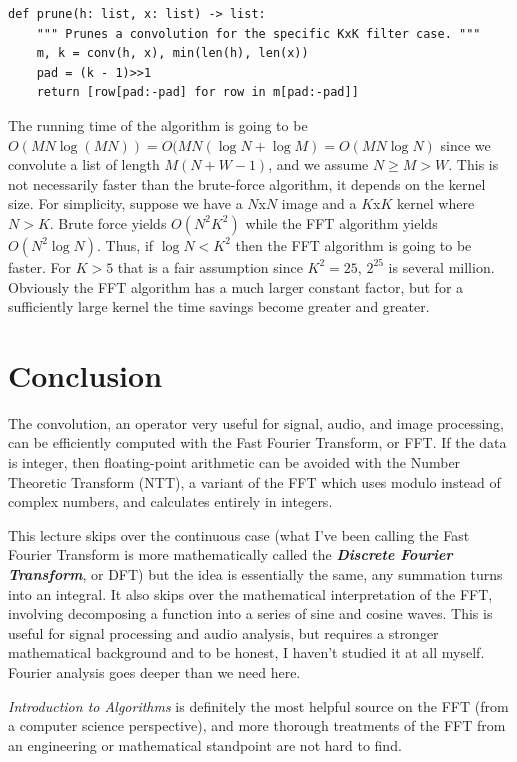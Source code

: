 \documentclass[11pt, oneside]{article}
\newcommand{\emphasis}[1]{\textbf{\textit{#1}}}
\theoremstyle{plain}
\theoremstyle{definition}
\begin{document}
\begin{verbatim}
def prune(h: list, x: list) -> list:
    """ Prunes a convolution for the specific KxK filter case. """
    m, k = conv(h, x), min(len(h), len(x))
    pad = (k - 1)>>1
    return [row[pad:-pad] for row in m[pad:-pad]]
\end{verbatim}

The running time of the algorithm is going to be
\( O(MN \log(MN)) = O(MN(\log N + \log M) = O(MN \log N) \) since we convolute 
a list of length \( M(N + W - 1) \), and we assume \( N \geq M > W \).
This is not necessarily faster than the brute-force algorithm,
it depends on the kernel size. For simplicity, suppose we have a \( N \)x\( N \)
image and a \( K \)x\( K \) kernel where \( N > K \). Brute force yields
\( O(N^2 K^2) \) while the FFT algorithm yields \( O(N^2 \log N) \).
Thus, if \( \log N < K^2 \) then the FFT algorithm is going to be faster.
For \( K > 5 \) that is a fair assumption since \( K^2 = 25 \), \( 2^{25} \)
is several million. Obviously the FFT algorithm has a much larger constant
factor, but for a sufficiently large kernel the time savings become greater
and greater.

\section{Conclusion}

The convolution, an operator very useful for signal, audio, and image
processing, can be efficiently computed with the Fast Fourier Transform, or FFT.
If the data is integer, then floating-point arithmetic can be avoided with the
Number Theoretic Transform (NTT), a variant of the FFT which uses modulo
instead of complex numbers, and calculates entirely in integers.

This lecture skips over the continuous case (what I've been calling the 
Fast Fourier Transform is more mathematically called the
\emphasis{Discrete Fourier Transform}, or DFT) but the idea is essentially the
same, any summation turns into an integral. It also skips over the mathematical
interpretation of the FFT, involving decomposing a function into a series of
sine and cosine waves. This is useful for signal processing and audio analysis,
but requires a stronger mathematical background and to be honest, I haven't
studied it at all myself. Fourier analysis goes deeper than we need here. 

\textit{Introduction to Algorithms} is definitely the most helpful source on
the FFT (from a computer science perspective), and more thorough treatments of
the FFT from an engineering or mathematical standpoint are not hard to find.
\end{document}
